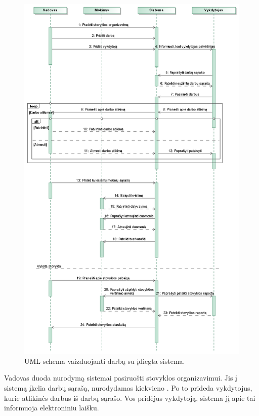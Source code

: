\begin{figure}[h!]
  \begin{center}
    \includegraphics[scale=0.7]{images/Seka.png}
    \caption{UML schema vaizduojanti darbą su įdiegta sistema.}
  \end{center}
  \label{fig:uml_usecase}
\end{figure}

Vadovas duoda nurodymą sistemai pasiruošti stovyklos organizavimui.
Jis į sistemą įkelia darbų sąrašą, nurodydamas kiekvieno \glsdarbpozvnsg.  
Po to prideda vykdytojus, kurie atlikinės darbus iš darbų sąrašo. 
Vos pridėjus vykdytoją, sistema jį apie tai informuoja elektroniniu laišku. 

